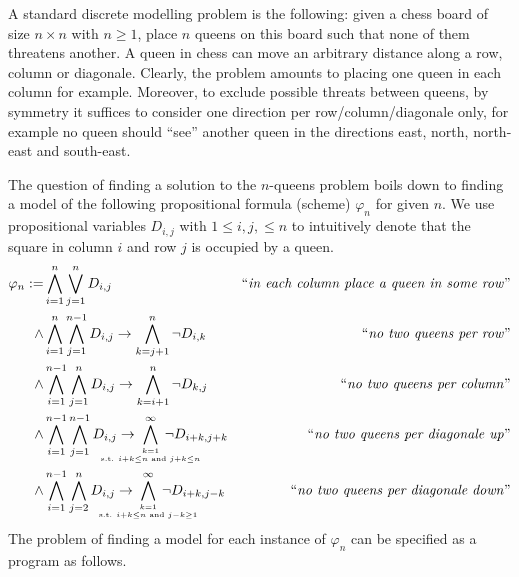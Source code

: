 \documentclass[twoside]{article}
\begin{document}
A standard discrete modelling problem is the following: given a chess board of size $n \times n$ with $n \ge 1$, place $n$ queens on this board such that
none of them threatens another. A queen in chess can move an arbitrary distance along a row, column or diagonale. Clearly, the problem
amounts to placing one queen in each column for example. Moreover, to exclude possible threats between queens, by symmetry it suffices to
consider one direction per row/column/diagonale only, for example no queen should ``see'' another queen in the directions east, north, 
north-east and south-east. 

The question of finding a solution to the $n$-queens problem boils down to finding a model of the following propositional formula (scheme) $\varphi_n$ for
given $n$. We use propositional variables $D_{i,j}$ with $1 \le i,j, \le n$ to intuitively denote that the square in column $i$ and row $j$ is occupied by a queen.
\begin{align*}
\varphi_n := & \bigwedge\limits_{i=1}^n \bigvee\limits_{j=1}^n D_{i,j} & \text{``\emph{in each column place a queen in some row}''} \\
\wedge & \bigwedge\limits_{i=1}^n \bigwedge\limits_{j=1}^{n-1} D_{i,j} \to \bigwedge\limits_{k=j+1}^n \neg D_{i,k} & \text{``\emph{no two queens per row}''} \\ 
\wedge & \bigwedge\limits_{i=1}^{n-1} \bigwedge\limits_{j=1}^n D_{i,j} \to \bigwedge\limits_{k=i+1}^n \neg D_{k,j} & \text{``\emph{no two queens per column}''} \\ 
\wedge & \bigwedge\limits_{i=1}^{n-1} \bigwedge\limits_{j=1}^{n-1} D_{i,j} \to \hspace*{-1cm} 
  \bigwedge\limits_{k = 1 \atop \text{s.t. } i+k \le n \text{ and } j+k \le n}^\infty \hspace*{-1cm}\neg D_{i+k,j+k} 
  & \text{``\emph{no two queens per diagonale up}''} \\ 
\wedge & \bigwedge\limits_{i=1}^{n-1} \bigwedge\limits_{j=2}^{n} D_{i,j} \to \hspace*{-1cm} 
  \bigwedge\limits_{k = 1 \atop \text{s.t. } i+k \le n \text{ and } j-k \ge 1}^\infty \hspace*{-1cm}\neg D_{i+k,j-k} 
  & \text{``\emph{no two queens per diagonale down}''} \\ 
\end{align*}
The problem of finding a model for each instance of $\varphi_n$ can be specified as a \DiMo program as follows.
\end{document}
